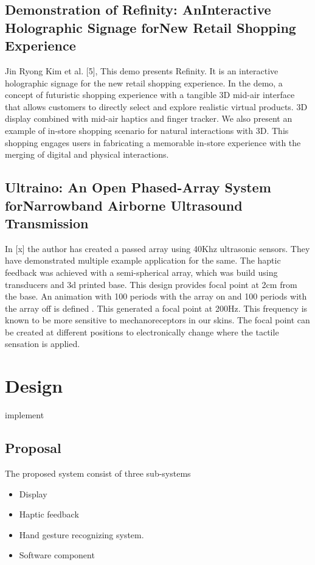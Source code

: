 \documentclass{fisatproject}
\begin{document}
\section{Demonstration of Refinity: AnInteractive Holographic Signage forNew Retail Shopping Experience}
\par Jin Ryong Kim et al. [5], This demo presents Refinity. It is an interactive holographic signage for the new retail shopping experience. In the demo,  a concept of futuristic shopping experience with a tangible 3D mid-air interface that allows customers to directly select and explore realistic virtual products. 3D display combined with mid-air haptics and finger tracker. We also present an example of in-store shopping scenario for natural interactions with 3D. This shopping  engages users in fabricating a memorable in-store experience with the merging of digital and physical interactions.
\section{Ultraino: An Open Phased-Array System forNarrowband Airborne Ultrasound Transmission}
\par In [x] the author has created a passed array using 40Khz ultrasonic sensors. They have demonstrated multiple example application for the same.
The haptic feedback was achieved with a semi-spherical array, which was build using transducers and 3d printed base. This design provides focal point at 2cm from the base.
An animation with 100 periods with the array on and 100 periods with  the  array  off is defined . This generated a focal point at 200Hz. This frequency is known to be more sensitive to mechanoreceptors in our skins. The focal point can be created at different positions to electronically  change  where  the  tactile  sensation  is  applied.
\chapter{Design}

implement
\section{Proposal}
The proposed system consist of three sub-systems
\begin{itemize}
    \item  Display
    \item Haptic feedback
    \item Hand gesture recognizing system.
    \item Software component
\end{itemize}
\end{document}
